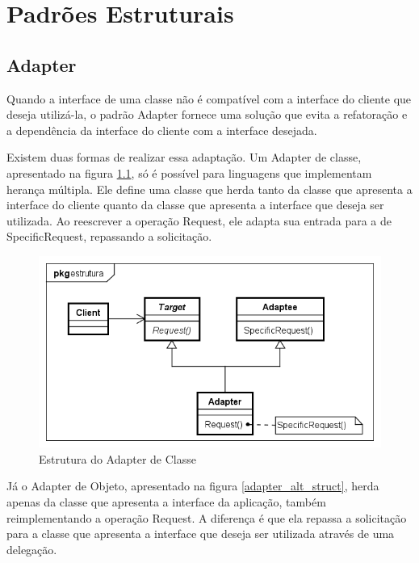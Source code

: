 \chapter{Padrões Estruturais}

\section{Adapter}

Quando a interface de uma classe não 
é compatível com a interface do cliente que deseja 
utilizá-la, o padrão Adapter fornece uma 
solução que evita a refatoração e a dependência da 
interface do cliente com a interface desejada.

Existem duas formas de realizar essa adaptação. Um Adapter 
de classe, apresentado na figura \ref{adapter_struct},  
só é possível para linguagens que implementam herança 
múltipla.
Ele define uma classe que herda tanto da classe que 
apresenta a interface do cliente quanto da classe que 
apresenta a interface que deseja ser utilizada. Ao 
reescrever a operação Request, ele adapta sua entrada 
para a de SpecificRequest, repassando a solicitação.

\begin{figure}[htb]
	\caption{\label{adapter_struct}Estrutura do Adapter de Classe}
	\begin{center}
	    \includegraphics[scale=0.5]{5_padroes-contexto-funcional/5.2_estruturais/5.2.1_adapter/adapter_classe_estrutura.png}
	\end{center}
\end{figure}

Já o Adapter de Objeto, apresentado na figura \ref{adapter_alt_struct}, 
herda apenas da classe que apresenta a interface 
da aplicação, também reimplementando a operação Request. 
A diferença é que ela repassa a solicitação para a 
classe que apresenta a interface que deseja ser 
utilizada através de uma delegação.

